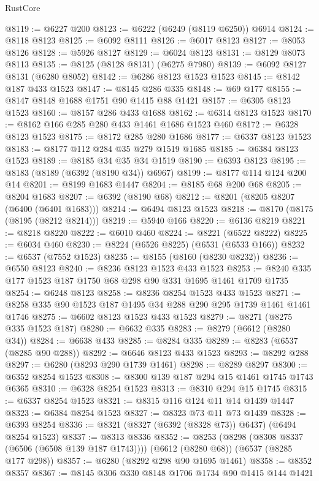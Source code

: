 \begin{lexlean}{RustCore}
\begin{coremodule}
@8119 := @6227 @200
@8123 := @6222 (@6249 (@8119 @6250)) @6914
@8124 := @8118 @8123
@8125 := @6092 @8111
@8126 := @6017 @8123
@8127 := @8053 @8126
@8128 := @5926 @8127
@8129 := @6024 @8123
@8131 := @8129 @8073 @8113
@8135 := @8125 (@8128 @8131) (@6275 @7980)
@8139 := @6092 @8127 @8131 (@6280 @8052)
@8142 := @6286 @8123 @1523 @1523
@8145 := @8142 @187 @433 @1523
@8147 := @8145 @286 @335
@8148 := @69 @177
@8155 := @8147 @8148 @1688 @1751 @90 @1415 @88 @1421
@8157 := @6305 @8123 @1523
@8160 := @8157 @286 @433 @1688
@8162 := @6314 @8123 @1523
@8170 := @8162 @166 @285 @280 @433 @1461 @1686 @1523 @460
@8172 := @6328 @8123 @1523
@8175 := @8172 @285 @280 @1686
@8177 := @6337 @8123 @1523
@8183 := @8177 @112 @284 @35 @279 @1519 @1685
@8185 := @6384 @8123 @1523
@8189 := @8185 @34 @35 @34 @1519
@8190 := @6393 @8123
@8195 := @8183 (@8189 (@6392 (@8190 @34)) @6967)
@8199 := @8177 @114 @124 @200 @14
@8201 := @8199 @1683 @1447
@8204 := @8185 @68 @200 @68
@8205 := @8204 @1683
@8207 := @6392 (@8190 @68)
@8212 := @8201 (@8205 @8207 (@6400 (@6401 @1683)))
@8214 := @6494 @8123 @1523
@8218 := @8170 (@8175 (@8195 (@8212 @8214)))
@8219 := @5940 @166
@8220 := @6136 @8219
@8221 := @8218 @8220
@8222 := @6010 @460
@8224 := @8221 (@6522 @8222)
@8225 := @6034 @460
@8230 := @8224 (@6526 @8225) (@6531 (@6533 @166))
@8232 := @6537 (@7552 @1523)
@8235 := @8155 (@8160 (@8230 @8232))
@8236 := @6550 @8123
@8240 := @8236 @8123 @1523 @433 @1523
@8253 := @8240 @335 @177 @1523 @187 @1750 @68 @298 @90 @331 @1695 @1461 @1709 @1735
@8254 := @6248 @8123
@8258 := @8236 @8254 @1523 @433 @1523
@8271 := @8258 @335 @90 @1523 @187 @1495 @34 @288 @290 @295 @1739 @1461 @1461 @1746
@8275 := @6602 @8123 @1523 @433 @1523
@8279 := @8271 (@8275 @335 @1523 @187)
@8280 := @6632 @335
@8283 := @8279 (@6612 (@8280 @34))
@8284 := @6638 @433
@8285 := @8284 @335
@8289 := @8283 (@6537 (@8285 @90 @288))
@8292 := @6646 @8123 @433 @1523
@8293 := @8292 @288
@8297 := @6280 (@8293 @290 @1739 @1461)
@8298 := @8289 @8297
@8300 := @6352 @8254 @1523
@8308 := @8300 @139 @187 @294 @15 @1461 @1745 @1743 @6365
@8310 := @6328 @8254 @1523
@8313 := @8310 @294 @15 @1745
@8315 := @6337 @8254 @1523
@8321 := @8315 @116 @124 @11 @14 @1439 @1447
@8323 := @6384 @8254 @1523
@8327 := @8323 @73 @11 @73 @1439
@8328 := @6393 @8254
@8336 := @8321 (@8327 (@6392 (@8328 @73)) @6437) (@6494 @8254 @1523)
@8337 := @8313 @8336
@8352 := @8253
    (@8298 (@8308 @8337 (@6506 (@6508 @139 @187 @1743))))
    (@6612 (@8280 @68))
    (@6537 (@8285 @177 @298))
@8357 := @6280 (@8292 @298 @90 @1695 @1461)
@8358 := @8352 @8357
@8367 := @8145 @306 @330 @8148 @1706 @1734 @90 @1415 @144 @1421

\end{coremodule}
\end{lexlean}
